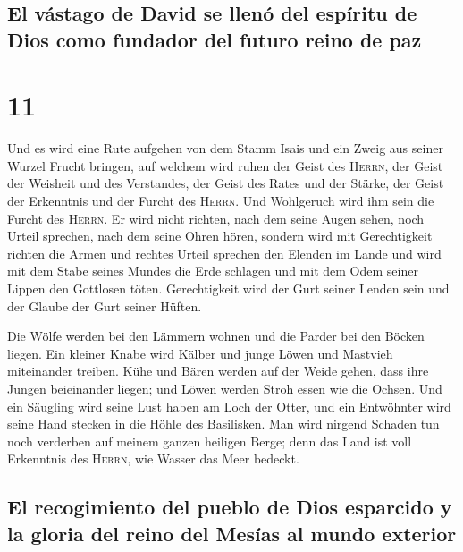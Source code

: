 \hypertarget{el-vuxe1stago-de-david-se-llenuxf3-del-espuxedritu-de-dios-como-fundador-del-futuro-reino-de-paz}{%
\subsection{El vástago de David se llenó del espíritu de Dios como
fundador del futuro reino de
paz}\label{el-vuxe1stago-de-david-se-llenuxf3-del-espuxedritu-de-dios-como-fundador-del-futuro-reino-de-paz}}

\hypertarget{section-10}{%
\section{11}\label{section-10}}

 Und es wird eine Rute aufgehen von dem Stamm Isais und
ein Zweig aus seiner Wurzel Frucht bringen,  auf welchem
wird ruhen der Geist des \textsc{Herrn}, der Geist der Weisheit und des
Verstandes, der Geist des Rates und der Stärke, der Geist der Erkenntnis
und der Furcht des \textsc{Herrn}.  Und Wohlgeruch wird
ihm sein die Furcht des \textsc{Herrn}. Er wird nicht richten, nach dem
seine Augen sehen, noch Urteil sprechen, nach dem seine Ohren hören,
 sondern wird mit Gerechtigkeit richten die Armen und
rechtes Urteil sprechen den Elenden im Lande und wird mit dem Stabe
seines Mundes die Erde schlagen und mit dem Odem seiner Lippen den
Gottlosen töten.  Gerechtigkeit wird der Gurt seiner
Lenden sein und der Glaube der Gurt seiner Hüften.

 Die Wölfe werden bei den Lämmern wohnen und die Parder
bei den Böcken liegen. Ein kleiner Knabe wird Kälber und junge Löwen und
Mastvieh miteinander treiben.  Kühe und Bären werden auf
der Weide gehen, dass ihre Jungen beieinander liegen; und Löwen werden
Stroh essen wie die Ochsen.  Und ein Säugling wird seine
Lust haben am Loch der Otter, und ein Entwöhnter wird seine Hand stecken
in die Höhle des Basilisken.  Man wird nirgend Schaden tun
noch verderben auf meinem ganzen heiligen Berge; denn das Land ist voll
Erkenntnis des \textsc{Herrn}, wie Wasser das Meer bedeckt.

\hypertarget{el-recogimiento-del-pueblo-de-dios-esparcido-y-la-gloria-del-reino-del-mesuxedas-al-mundo-exterior}{%
\subsection{El recogimiento del pueblo de Dios esparcido y la gloria del
reino del Mesías al mundo
exterior}\label{el-recogimiento-del-pueblo-de-dios-esparcido-y-la-gloria-del-reino-del-mesuxedas-al-mundo-exterior}}

